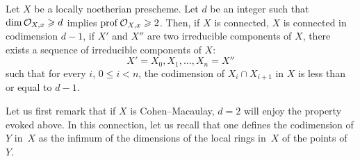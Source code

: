 \begin{corollary} \label{III.3.7}
Let $X$ be a locally noetherian prescheme. Let $d$ be an integer such that $\dim {\mathcal O}_{X, x} \geqslant d$ implies $\operatorname{prof} {\mathcal O}_{X, x} \geqslant 2$. Then, if $X$ is connected, $X$ is connected in codimension $d-1$, \ie if $X'$ and $X''$ are two irreducible components of $X$, there exists a sequence of irreducible components of $X$:
\[
X'=X_0, X_1, \ldots, X_n=X''
\]
such that for every $i$, $0\leq i < n$, the codimension of $X_{i}\cap X_{i+1}$ in $X$ is less than or equal to $d-1$.
\end{corollary}

Let us first remark that if $X$ is Cohen--Macaulay, $d=2$ will enjoy the property evoked above. In this connection, let us recall that one defines the codimension of $Y$ in~$X$ as the infimum of the dimensions of the local rings in~$X$ of the points of~$Y$.

